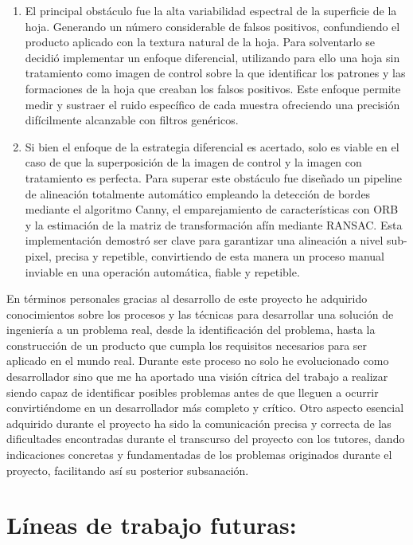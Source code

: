 \begin{enumerate}

\item El principal obstáculo fue la alta variabilidad espectral de la superficie de la hoja. Generando un número considerable de falsos positivos, confundiendo el producto aplicado con la textura natural de la hoja. Para solventarlo  se decidió implementar un enfoque diferencial, utilizando para ello una hoja sin tratamiento como imagen de control sobre la que identificar los patrones y las formaciones de la hoja que creaban los falsos positivos. Este enfoque permite medir y sustraer el ruido específico de cada muestra ofreciendo una precisión difícilmente alcanzable con filtros genéricos.

\item Si bien el enfoque de la estrategia diferencial es acertado, solo es viable en el caso de que la superposición de la imagen de control y la imagen con tratamiento es perfecta. Para superar este obstáculo fue diseñado un pipeline de alineación totalmente automático empleando la detección de bordes mediante el algoritmo Canny, el emparejamiento de características con ORB y la estimación de la matriz de transformación afín mediante RANSAC. Esta implementación demostró ser clave para garantizar una alineación a nivel sub-pixel, precisa y repetible, convirtiendo de esta manera un  proceso manual inviable en una operación automática, fiable y repetible.
\end{enumerate}


En términos personales gracias al desarrollo de este proyecto he adquirido conocimientos sobre los procesos y las técnicas para desarrollar una solución de ingeniería a un problema real, desde la identificación del problema, hasta la construcción de un producto que cumpla los requisitos necesarios para ser aplicado en el mundo real. Durante este proceso no solo he evolucionado como desarrollador sino que me ha aportado una visión cítrica del trabajo a realizar siendo capaz de identificar posibles problemas antes de que lleguen a ocurrir convirtiéndome en un desarrollador más completo y crítico. 
Otro aspecto esencial adquirido durante el proyecto ha sido la comunicación precisa y correcta de las dificultades encontradas durante el transcurso del proyecto con los tutores, dando indicaciones concretas y fundamentadas de los problemas originados durante el proyecto, facilitando así su posterior subsanación.



\section{Líneas de trabajo futuras:}

